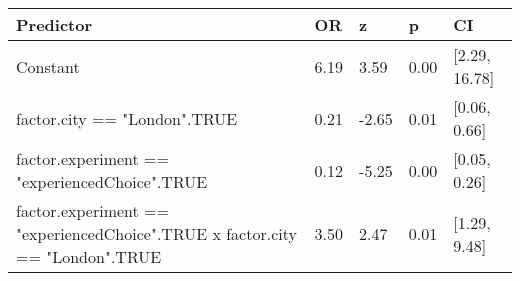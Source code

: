 \begin{tabular}{lllll}
  \toprule
Predictor & OR & z & p & CI \\ 
  \midrule
Constant & 6.19 & 3.59 & 0.00 & [2.29, 16.78] \\ 
  factor.city == "London".TRUE & 0.21 & -2.65 & 0.01 & [0.06, 0.66] \\ 
  factor.experiment == "experiencedChoice".TRUE & 0.12 & -5.25 & 0.00 & [0.05, 0.26] \\ 
  factor.experiment == "experiencedChoice".TRUE x factor.city == "London".TRUE & 3.50 & 2.47 & 0.01 & [1.29, 9.48] \\ 
   \bottomrule
\end{tabular}
